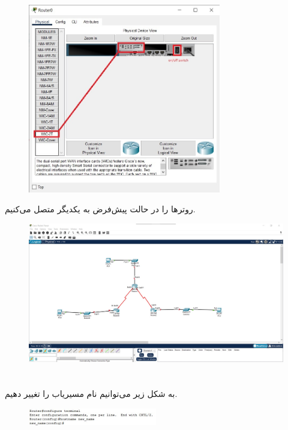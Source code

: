 \documentclass{article}
\begin{document}
\begin{figure}[H]
    \centering
    \includegraphics[width=0.75\textwidth]{figures/3.jpg}
    \caption{}
    \label{fig:fig1}
\end{figure}
روترها را در حالت پیش‌فرض به یکدیگر متصل می‌کنیم.
\begin{figure}[H]
    \centering
    \includegraphics[width=1.0\textwidth]{figures/4.jpg}
    \caption{}
    \label{fig:fig1}
\end{figure}








\section{}%
به شکل زیر می‌توانیم نام مسیریاب را تغییر دهیم.
\begin{figure}[H]
    \centering
    \includegraphics[width=0.5\textwidth]{figures/28.jpg}
    \caption{}
    \label{fig:fig1}
\end{figure}
\end{document}
